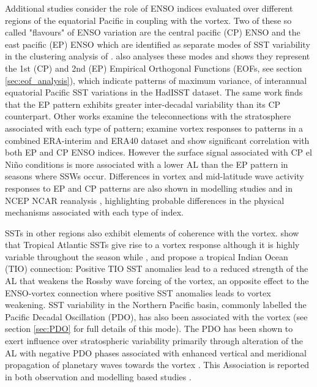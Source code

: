 Additional studies consider the role of ENSO indices evaluated over different regions of the equatorial Pacific in coupling with the vortex. Two of these so called  "flavours" of ENSO variation are the central pacific (CP) ENSO and the east pacific (EP) ENSO which are identified as separate modes of SST variability in the clustering analysis of \cite{johnsonHow2013f}. \cite{kaoContrasting2009d} also analyses these modes and shows they represent the 1st (CP) and 2nd (EP) Empirical Orthogonal Functions (EOFs, see section \ref{sec:eof_analysis}), which indicate patterns of maximum variance, of interannual equatorial Pacific SST variations in the HadISST dataset. The same work finds that the EP pattern exhibits greater inter-decadal variability than its CP counterpart. Other works examine the teleconnections with the stratosphere associated with each type of pattern; \cite{izaRole2015b} examine vortex responses to patterns in a combined ERA-interim and ERA40 dataset and show significant correlation with both EP and CP ENSO indices. However the surface signal associated with CP el Ni\~{n}o conditions is more associated with a lower AL than the EP pattern in seasons where SSWs occur. Differences in vortex and mid-latitude wave activity responses to EP and CP patterns are also shown in modelling studies \citep{hegyiDynamical2011b} and in NCEP NCAR reanalysis \citep{sungAltered2014b}, highlighting probable differences in the physical mechanisms associated with each type of index. 

SSTs in other regions also exhibit elements of coherence with the vortex. \cite{raoVarying2018d} show that Tropical Atlantic SSTs give rise to a vortex response although it is highly variable throughout the season while \cite{fletcherRole2011b}, \cite{fletcherLinear2013b} and \cite{raoDecomposition2016b} propose a tropical Indian Ocean (TIO) connection: Positive TIO SST anomalies lead to a reduced strength of the AL that weakens the Rossby wave forcing of the vortex, an opposite effect to the ENSO-vortex connection where positive SST anomalies leads to vortex weakening. SST variability in the Northern Pacific basin, commonly labelled the Pacific Decadal Oscillation (PDO), has also been associated with the vortex (see section \ref{sec:PDO} for full details of this mode). The PDO has been shown to exert influence over stratospheric variability primarily through alteration of the AL with negative PDO phases associated with enhanced vertical and meridional propagation of planetary waves towards the vortex \citep{mantuaPacific1997a, rodionovSpatial2005b,raoModulation2019d}. This Association is reported in both observation and modelling based studies \citep{garcia-herreraPropagation2006b, krenWintertime2016b, huDecadal2018b}.

